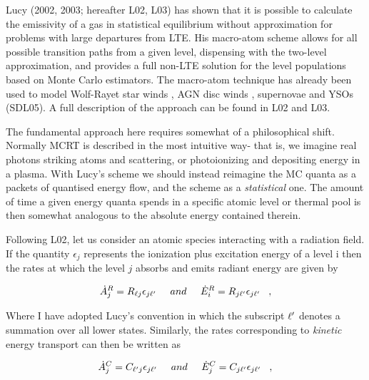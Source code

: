 Lucy (2002, 2003\nocite{lucy2002, lucy2003}; hereafter L02, L03) 
has shown that it is possible to calculate the emissivity of a gas in
statistical equilibrium without approximation for problems with large departures
from LTE.
His macro-atom scheme allows for all possible transition paths from a given level,
dispensing with the two-level approximation, and
provides a full non-LTE solution
for the level populations based on Monte Carlo estimators. The macro-atom
technique has already been used to model Wolf-Rayet star
winds \citep{sim2004}, AGN disc winds \citep{simlong2008, tatum2012},
supernovae \citep{kromersim2009, kerzendorfsim} and YSOs (SDL05). A full 
description of the approach can be found in L02 and L03. 

The fundamental approach here requires somewhat of a philosophical shift.
Normally MCRT is described in the most intuitive way- that is, we imagine
real photons striking atoms and scattering, or photoionizing 
and depositing energy in a plasma. With Lucy's scheme we should instead 
reimagine the MC quanta as a packets of quantised energy flow, and the scheme as a 
{\em statistical} one. The amount of time a given energy quanta spends in a specific atomic
level or thermal pool is then somewhat analogous to the absolute energy 
contained therein.

Following L02, let us consider an atomic species interacting with a radiation field.
If the quantity $\epsilon_j$ represents the ionization plus excitation energy of 
a level i then the rates at which the level $j$ absorbs and emits radiant energy 
are given by

\begin{equation}
 \dot{A}_{j}^{R} = R_{\ell j} \epsilon_{j \ell^\prime} \;\;\;\;\; and \;\;\;
\;\;  \dot{E}_{i}^{R} = R_{j \ell^\prime} \epsilon_{j \ell^\prime} \;\;\; ,
\end{equation}

Where I have adopted Lucy's convention in which the subscript 
$\ell^\prime$ denotes a summation over all lower states.
Similarly, the rates corresponding to {\em kinetic} energy transport can then be written as

\begin{equation}
 \dot{A}_{j}^{C} = C_{\ell^\prime j} \epsilon_{j \ell^\prime} \;\;\;\;\; and
\;\;\;
\;\;  \dot{E}_{j}^{C} = C_{j \ell^\prime} \epsilon_{j \ell^\prime} \;\;\; ,
\end{equation}

